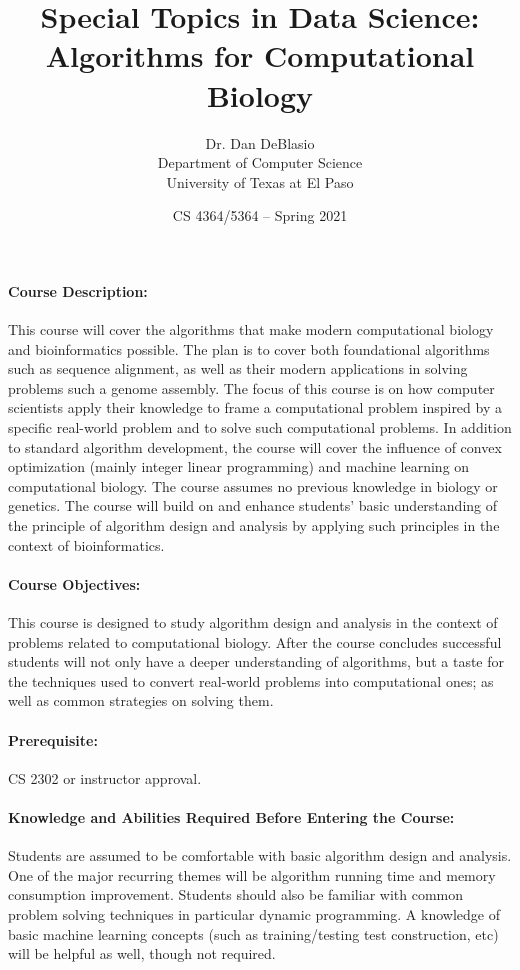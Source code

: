 \documentclass[12pt]{scrartcl}
\title{Special Topics in Data Science: 
Algorithms for Computational Biology}\let\Title\@title
\subtitle{
{\small
\vskip0.5cm
Dr. Dan DeBlasio\\
Department of Computer Science \\
University of Texas at El Paso}
\vskip-1cm}
\date{\small CS 4364/5364 -- Spring 2021}
\begin{document}

\maketitle


\paragraph{Course Description:} 
This course will cover the algorithms that make modern computational biology and bioinformatics possible. 
The plan is to cover both foundational algorithms such as sequence alignment, 
as well as their modern applications in solving problems such a genome assembly. 
The focus of this course is on how computer scientists apply their knowledge to frame a computational problem inspired by a specific real-world problem 
and to solve such computational problems. 
In addition to standard algorithm development, 
the course will cover the influence of convex optimization (mainly integer linear programming) and machine learning on computational biology. 
The course assumes no previous knowledge in biology or genetics. 
The course will build on and enhance students’ basic understanding of the principle of algorithm design and analysis by applying such principles in the context of bioinformatics.


\paragraph{Course Objectives:} This course is designed to study algorithm design and analysis in the context of problems related to computational biology. 
After the course concludes successful students will not only have a deeper understanding of algorithms, but a taste for the techniques used to convert real-world problems into computational ones;
as well as common strategies on solving them. 


\paragraph{Prerequisite:} CS 2302 or instructor approval. 

\paragraph{Knowledge and Abilities Required Before Entering the Course:} Students are assumed to be comfortable with basic algorithm design and analysis. 
One of the major recurring themes will be algorithm running time and memory consumption improvement. 
Students should also be familiar with common problem solving techniques in particular dynamic programming.
A knowledge of basic machine learning concepts (such as training/testing test construction, etc) will be helpful as well, though not required. 
\end{document}
